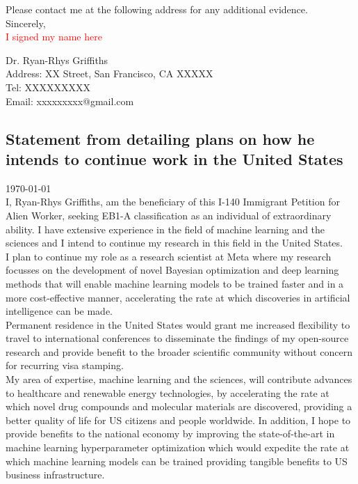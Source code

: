\documentclass[11pt]{article}
\begin{document}
Please contact me at the following address for any additional evidence.\\

Sincerely,\\

\textcolor{red}{I signed my name here}


\vspace{1.5em}
Dr. Ryan-Rhys Griffiths\\

Address: XX Street, San Francisco, CA XXXXX\\
Tel: XXXXXXXXX\\
Email: xxxxxxxxx@gmail.com\\

\newpage



\subsection*{Statement from \dr detailing plans on how he intends to continue work in the United States}

\today\\

I, Ryan-Rhys Griffiths, am the beneficiary of this I-140 Immigrant Petition for Alien Worker, seeking EB1-A classification as an individual of extraordinary ability. I have extensive experience in the field of machine learning and the sciences and I intend to continue my research in this field in the United States. \\

I plan to continue my role as a research scientist at Meta where my research focusses on the development of novel Bayesian optimization and deep learning methods that will enable machine learning models to be trained faster and in a more cost-effective manner, accelerating the rate at which discoveries in artificial intelligence can be made.\\

Permanent residence in the United States would grant me increased flexibility to travel to international conferences to disseminate the findings of my open-source research and provide benefit to the broader scientific community without concern for recurring visa stamping. \\

My area of expertise, machine learning and the sciences, will contribute advances to healthcare and renewable energy technologies, by accelerating the rate at which novel drug compounds and molecular materials are discovered, providing a better quality of life for US citizens and people worldwide. In addition, I hope to provide benefits to the national economy by improving the state-of-the-art in machine learning hyperparameter optimization which would expedite the rate at which machine learning models can be trained providing tangible benefits to US business infrastructure.\\
\end{document}
